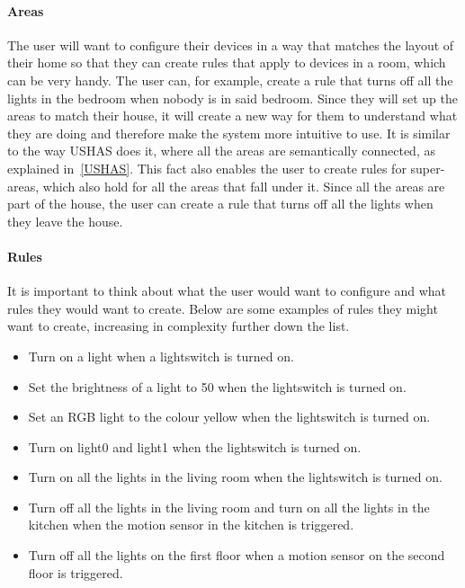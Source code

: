\documentclass[11pt,a4paper]{report}
\begin{document}
\paragraph{Areas}
The user will want to configure their devices in a way that matches the layout of their home so that they can create rules that apply to devices in a room, which can be very handy. The user can, for example, create a rule that turns off all the lights in the bedroom when nobody is in said bedroom. Since they will set up the areas to match their house, it will create a new way for them to understand what they are doing and therefore make the system more intuitive to use. It is similar to the way USHAS does it, where all the areas are semantically connected, as explained in~\ref{USHAS}. This fact also enables the user to create rules for super-areas, which also hold for all the areas that fall under it. Since all the areas are part of the house, the user can create a rule that turns off all the lights when they leave the house.

\paragraph{Rules}
It is important to think about what the user would want to configure and what rules they would want to create. Below are some examples of rules they might want to create, increasing in complexity further down the list.
\begin{itemize}
    \item Turn on a light when a lightswitch is turned on.
    \item Set the brightness of a light to 50 when the lightswitch is turned on.
    \item Set an RGB light to the colour yellow when the lightswitch is turned on.
    \item Turn on light0 and light1 when the lightswitch is turned on.
    \item Turn on all the lights in the living room when the lightswitch is turned on.
    \item Turn off all the lights in the living room and turn on all the lights in the kitchen when the motion sensor in the kitchen is triggered.
    \item Turn off all the lights on the first floor when a motion sensor on the second floor is triggered.
\end{itemize}
\end{document}
